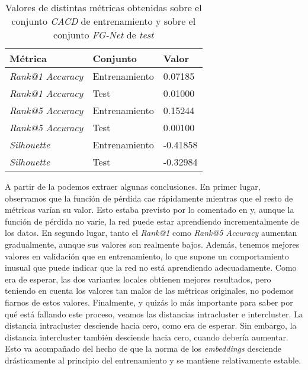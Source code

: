 \begin{table}[!hbtp]
\centering
\begin{tabular}{|l|l|l|}
    \hline
    Métrica & Conjunto & Valor \\
    \hline

    \textit{Rank@1 Accuracy} & Entrenamiento & 0.07185 \\
    \textit{Rank@1 Accuracy} & Test & 0.01000 \\
    \textit{Rank@5 Accuracy} & Entrenamiento & 0.15244 \\
    \textit{Rank@5 Accuracy} & Test & 0.00100 \\
    \textit{Silhouette} & Entrenamiento & -0.41858 \\
    \textit{Silhouette} & Test & -0.32984 \\

    \hline

\end{tabular}
\caption{Valores de distintas métricas obtenidas sobre el conjunto \textit{CACD} de entrenamiento y sobre el conjunto \textit{FG-Net} de \textit{test}}
    \label{table:resultados_sobre_fg_net}
\end{table}

A partir de la  podemos extraer algunas conclusiones. En primer lugar, observamos que la función de pérdida cae rápidamente mientras que el resto de métricas varían su valor. Esto estaba previsto por lo comentado en \cite{informatica:principal} y, aunque la función de pérdida no varíe, la red puede estar aprendiendo incrementalmente de los datos. En segundo lugar, tanto el \textit{Rank@1} como \textit{Rank@5 Accuracy} aumentan gradualmente, aunque sus valores son realmente bajos. Además, tenemos mejores valores en validación que en entrenamiento, lo que supone un comportamiento inusual que puede indicar que la red no está aprendiendo adecuadamente. Como era de esperar, las dos variantes locales obtienen mejores resultados, pero teniendo en cuenta los valores tan malos de las métricas originales, no podemos fiarnos de estos valores. Finalmente, y quizás lo más importante para saber por qué está fallando este proceso, veamos las distancias intracluster e intercluster. La distancia intracluster desciende hacia cero, como era de esperar. Sin embargo, la distancia intercluster también desciende hacia cero, cuando debería aumentar. Esto va acompañado del hecho de que la norma de los \textit{embeddings} desciende drásticamente al principio del entrenamiento y se mantiene relativamente estable.

